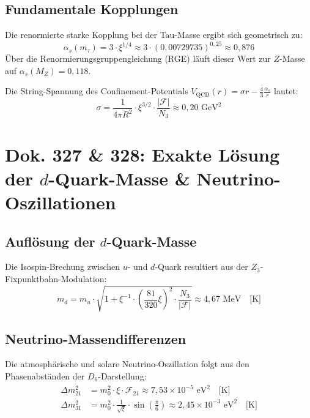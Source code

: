 \documentclass[11pt,a4paper]{article}
\begin{document}
	\subsection{Fundamentale Kopplungen}
	Die renormierte starke Kopplung bei der Tau-Masse ergibt sich geometrisch zu:
	\begin{equation}
		\alpha_s(m_\tau) = 3 \cdot \xi^{1/4} \approx 3 \cdot (0{,}00729735)^{0{,}25} \approx 0{,}876
	\end{equation}
	Über die Renormierungsgruppengleichung (RGE) läuft dieser Wert zur $Z$-Masse auf $\alpha_s(M_Z) = 0{,}118$.
	
	Die String-Spannung des Confinement-Potentials $V_{\text{QCD}}(r) = \sigma r - \frac{4}{3}\frac{\alpha_s}{r}$ lautet:
	\begin{equation}
		\sigma = \frac{1}{4\pi R^2} \cdot \xi^{3/2} \cdot \frac{|\mathcal{F}|}{N_3} \approx 0{,}20\text{ GeV}^2
	\end{equation}
	
	\section{Dok. 327 \& 328: Exakte Lösung der $d$-Quark-Masse \& Neutrino-Oszillationen}
	
	\subsection{Auflösung der $d$-Quark-Masse}
	Die Isospin-Brechung zwischen $u$- und $d$-Quark resultiert aus der $Z_3$-Fixpunktbahn-Modulation:
	\begin{equation}
		m_d = m_u \cdot \sqrt{1 + \xi^{-1} \cdot \left(\frac{81}{320}\xi\right)^2 \cdot \frac{N_3}{|\mathcal{F}|}} \approx 4{,}67\text{ MeV} \quad \text{[K]}
	\end{equation}
	
	\subsection{Neutrino-Massendifferenzen}
	Die atmosphärische und solare Neutrino-Oszillation folgt aus den Phasenabständen der $D_6$-Darstellung:
	\begin{align}
		\Delta m_{21}^2 &= m_0^2 \cdot \xi \cdot \mathcal{F}_{21} \approx 7{,}53 \times 10^{-5}\text{ eV}^2 \quad \text{[K]} \\
		\Delta m_{31}^2 &= m_0^2 \cdot \frac{1}{\sqrt{\xi}} \cdot \sin\left(\frac{\pi}{6}\right) \approx 2{,}45 \times 10^{-3}\text{ eV}^2 \quad \text{[K]}
	\end{align}
	
\end{document}
